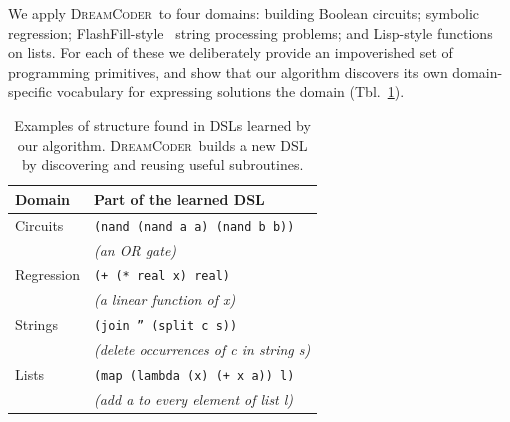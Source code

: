 \documentclass{article}
\newcommand{\system}{\textsc{DreamCoder}~}
\newcommand{\code}[1]{{\footnotesize\texttt{#1}}}
\begin{document}

We apply \system to four domains:
 building Boolean circuits; symbolic regression; FlashFill-style~\cite{gulwani2011automating} string processing problems; and Lisp-style functions on lists.
 For each of these we deliberately provide an impoverished
 set of programming primitives,
 and show that our algorithm discovers
 its own domain-specific vocabulary for expressing solutions the domain (Tbl.~\ref{initialExampleDSL}).
 \begin{table}
    \begin{tabular}{ll}
   \toprule
   Domain&Part of the learned DSL\\\midrule
   Circuits&\code{(nand (nand a a) (nand b b))}\\
   &\hspace{0.5cm} \emph{(an OR gate)}\\
   Regression& \code{(+ (* real x) real)} \\
      &\hspace{0.5cm} \emph{(a linear function of x)}\\
   Strings& \code{(join '' (split c s))}\\
   &\hspace{0.5cm} \emph{(delete occurrences of c in string s)}\\
   Lists& \code{(map (lambda (x) (+ x a)) l)}\\
   &\hspace{0.5cm} \emph{(add a to every element of list l)}
   \\\bottomrule
    \end{tabular}
    \caption{ Examples of structure found in DSLs  learned by our algorithm. \system builds a new DSL by discovering and reusing useful subroutines.}\label{initialExampleDSL}
 \end{table}


 
\end{document}
